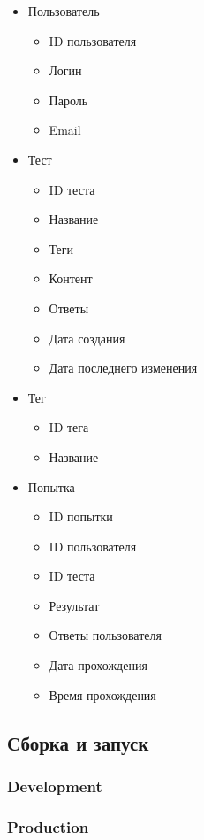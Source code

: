 \begin{itemize}
    \item Пользователь
    \begin{itemize}
        \item ID пользователя
        \item Логин
        \item Пароль
        \item Email
    \end{itemize}
    \item Тест
    \begin{itemize}
        \item ID теста
        \item Название
        \item Теги
        \item Контент
        \item Ответы
        \item Дата создания
        \item Дата последнего изменения
    \end{itemize}
    \item Тег
    \begin{itemize}
        \item ID тега
        \item Название
    \end{itemize}
    \item Попытка
    \begin{itemize}
        \item ID попытки
        \item ID пользователя
        \item ID теста
        \item Результат
        \item Ответы пользователя
        \item Дата прохождения
        \item Время прохождения
    \end{itemize}
\end{itemize}

\subsection{Сборка и запуск}
\subsubsection{Development}
\subsubsection{Production}


